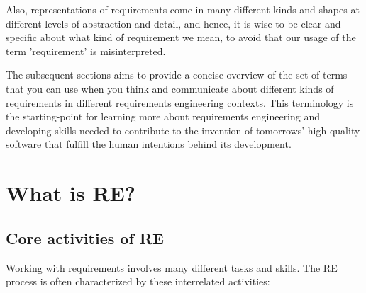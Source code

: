 Also, representations of requirements come in many different kinds and shapes at different levels of abstraction and detail, and hence, it is wise to be clear and specific about what kind of requirement we mean, to avoid that our usage of the term 'requirement' is misinterpreted. 


The subsequent sections aims to provide a concise overview of the set of terms that you can use when you think and communicate about different kinds of requirements in different requirements engineering contexts. This terminology is the starting-point for learning more about requirements engineering and developing skills needed to contribute to the invention of tomorrows' high-quality software that fulfill the human intentions behind its development.

\section{What is RE?}%
\subsection{Core activities of RE}%
\MarginPage{

}%
Working with requirements involves many different tasks and skills. The RE process is often characterized by these interrelated activities: 

